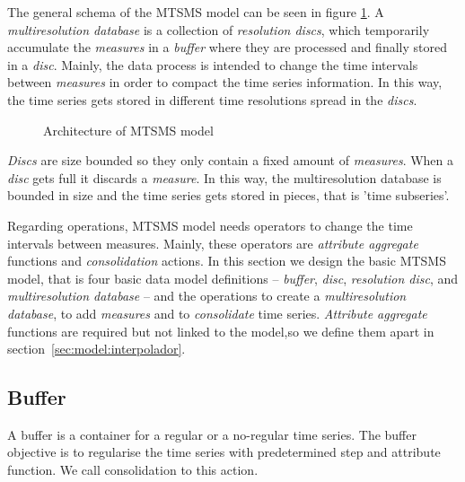 The general schema of the MTSMS model can be seen in figure
\ref{fig:model:mtsdb}.  A \emph{multiresolution database} is a
collection of \emph{resolution discs}, which temporarily accumulate
the \emph{measures} in a \emph{buffer} where they are processed and
finally stored in a \emph{disc}. Mainly, the data process is intended
to change the time intervals between \emph{measures} in order to
compact the time series information. In this way, the time series gets
stored in different time resolutions spread in the
\emph{discs}.


\begin{figure}[tp]
\centering

\caption{Architecture of MTSMS model}
\label{fig:model:mtsdb}
\end{figure}

\emph{Discs} are size bounded so they only contain a fixed amount of
\emph{measures}. When a \emph{disc} gets full it discards a
\emph{measure}. In this way, the multiresolution database is bounded
in size and the time series gets stored in pieces, that is 'time
subseries'.




Regarding operations, MTSMS model needs operators to change the time
intervals between measures. Mainly, these operators are
\emph{attribute aggregate} functions and \emph{consolidation}
actions. In this section we design the basic MTSMS model, that is four
basic data model definitions -- \emph{buffer}, \emph{disc},
\emph{resolution disc}, and \emph{multiresolution database} -- and the
operations to create a \emph{multiresolution database}, to add
\emph{measures} and to \emph{consolidate} time series. \emph{Attribute
  aggregate} functions are required but not linked to the model,so we
define them apart in section~\ref{sec:model:interpolador}.






\subsection{Buffer}\label{sec:model:buffer}

A buffer is a container for a regular or a no-regular time series. The
buffer objective is to regularise the time series with predetermined step 
and attribute function. We call consolidation to this action. 

